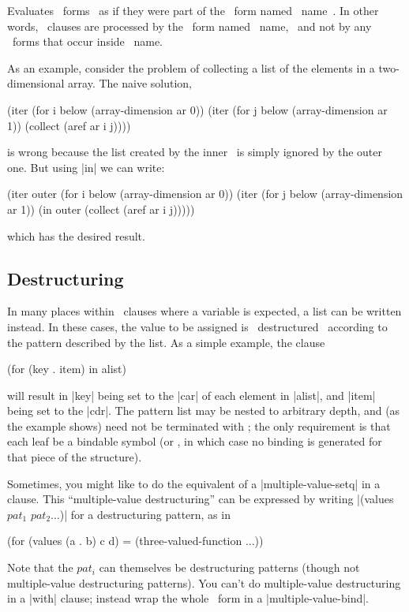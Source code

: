 \begin{clauses}

Evaluates ~forms~ as if they were part of the \iter\ form named
~name~.  In other words, \iter\ clauses are processed by the \iter\
form named ~name,~ and not by any \iter\ forms that occur inside ~name.~

\cpar As an example, consider the problem of collecting a list of the
elements in a two-dimensional array.  The naive solution,
\begin{program}
(iter (for i below (array-dimension ar 0))
      (iter (for j below (array-dimension ar 1))
            (collect (aref ar i j))))
\end{program}
\noindent is wrong because the list created by the inner \iter\ is simply
ignored by the outer one.  But using |in| we can write:
\begin{program}
(iter outer (for i below (array-dimension ar 0))
      (iter (for j below (array-dimension ar 1))
            (in outer (collect (aref ar i j)))))
\end{program}
\noindent which has the desired result.

\end{clauses}

\subsection{Destructuring}
\label{destructuring}

In many places within \iter\ clauses where a variable is expected, a
list can be written instead.  In these cases, the value to be assigned
is ~destructured~ according to the pattern
described by the list.  As a simple example, the clause
\begin{program}
(for (key . item) in alist)
\end{program}
\noindent will result in |key| being set to the |car| of
each element in |alist|, and |item| being set to the |cdr|.  The
pattern list may be nested to arbitrary depth, and (as the example
shows) need not be terminated with \nil; the only requirement is that
each leaf be a bindable symbol (or \nil, in which case no binding is
generated for that piece of the structure).

Sometimes, you might like to do the equivalent of a
|multiple-value-setq| in a clause.  This 
``multiple-value destructuring'' can be expressed by writing 
\linebreak |(values $pat_1$ $pat_2 \ldots$)| for a destructuring
pattern, as in 
\begin{program}
(for (values (a . b) c d) = (three-valued-function ...))
\end{program}
\begin{sloppypar}
Note that the $pat_i$ can themselves be destructuring patterns (though
not multiple-value destructuring patterns).  You can't do multiple-value
destructuring in a |with| clause; instead wrap the whole \iter\
form in a |multiple-value-bind|.
\end{sloppypar}


